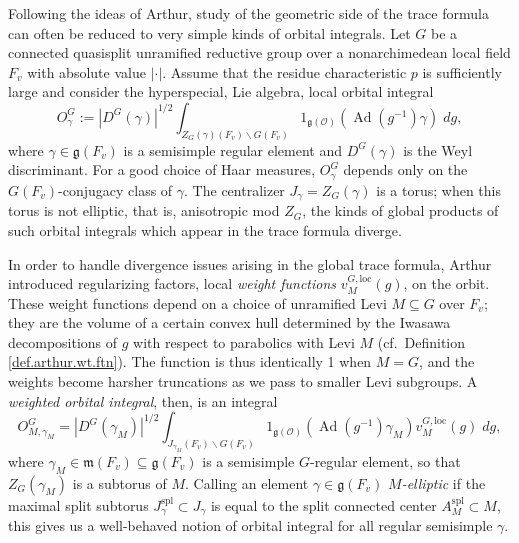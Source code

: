\documentclass[openany]{amsbook}
\theoremstyle{definition}
\theoremstyle{remark}
\numberwithin{equation}{section}
\renewcommand{\O}{\mathcal{O}}
\renewcommand{\-}{\operatorname{-}}
\newcommand{\on}[1]{\operatorname{#1}}
\newcommand{\fm}{\mathfrak{m}}
\renewcommand{\fm}{\mathfrak{m}}
\renewcommand{\fg}{\mathfrak{g}}
\newcommand{\Ad}{\on{Ad}}
\newcommand{\spl}{\mathrm{spl}}
\newcommand{\loc}{\mathrm{loc}}
\begin{document}
Following the ideas of Arthur, study of the geometric side of the trace formula can often be reduced to very simple kinds of orbital integrals. Let $G$ be a connected quasisplit unramified reductive group over a nonarchimedean local field $F_v$ with absolute value $|\cdot|$. Assume that the residue characteristic $p$ is sufficiently large and consider the hyperspecial, Lie algebra, local orbital integral
$$
    O_{\gamma}^G := |D^G(\gamma)|^{1/2} \int_{Z_G(\gamma)(F_v)\backslash G(F_v)} 1_{\fg(\O)}(\Ad(g^{-1}) \gamma) \; dg,
$$
where $\gamma \in \fg(F_v)$ is a semisimple regular element and $D^G(\gamma)$ is the Weyl discriminant. For a good choice of Haar measures, $O_{\gamma}^G$ depends only on the $G(F_v)$-conjugacy class of $\gamma$. The centralizer $J_\gamma = Z_G(\gamma)$ is a torus; when this torus is not elliptic, that is, anisotropic mod $Z_G$, the kinds of global products of such orbital integrals which appear in the trace formula diverge.  

In order to handle divergence issues arising in the global trace formula, Arthur introduced regularizing factors, local \textit{weight functions} $v_M^{G, \loc}(g)$, on the orbit. These weight functions depend on a choice of unramified Levi $M \subseteq G$ over $F_v$; they are the volume of a certain convex hull determined by the Iwasawa decompositions of $g$ with respect to parabolics with Levi $M$ (cf.\ Definition \ref{def.arthur.wt.ftn}). The function is thus identically 1 when $M = G$, and the weights become harsher truncations as we pass to smaller Levi subgroups. A \textit{weighted orbital integral}, then, is an integral
$$
    O_{M,\gamma_M}^G = |D^G(\gamma_M)|^{1/2} \int_{J_{\gamma_M}(F_v)\backslash G(F_v)} 1_{\fg(\O)}(\Ad(g^{-1}) \gamma_M) v^{G, \loc}_M(g)\; dg,
$$
where $\gamma_M \in \fm(F_v) \subseteq \fg(F_v)$ is a semisimple $G$-regular element, so that $Z_G(\gamma_M)$ is a subtorus of $M$. Calling an element $\gamma \in \fg(F_v)$ \textit{$M$-elliptic} if the maximal split subtorus $J_{\gamma}^{\spl} \subset J_{\gamma}$ is equal to the split connected center $A_M^{\spl} \subset M$, this gives us a well-behaved notion of orbital integral for all regular semisimple $\gamma$.
\end{document}
